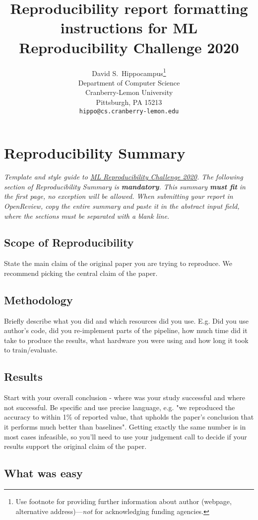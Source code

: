 \documentclass{article}
\title{Reproducibility report formatting instructions for ML Reproducibility Challenge 2020}
\author{%
  David S.~Hippocampus\thanks{Use footnote for providing further information
    about author (webpage, alternative address)---\emph{not} for acknowledging
    funding agencies.} \\
  Department of Computer Science\\
  Cranberry-Lemon University\\
  Pittsburgh, PA 15213 \\
  \texttt{hippo@cs.cranberry-lemon.edu} \\
}
\begin{document}
\maketitle

\section*{\centering Reproducibility Summary}

\textit{Template and style guide to \href{https://paperswithcode.com/rc2020}{ML Reproducibility Challenge 2020}. The following section of Reproducibility Summary is \textbf{mandatory}. This summary \textbf{must fit} in the first page, no exception will be allowed. When submitting your report in OpenReview, copy the entire summary and paste it in the abstract input field, where the sections must be separated with a blank line.
}

\subsection*{Scope of Reproducibility}

State the main claim of the original paper you are trying to reproduce. We recommend picking the central claim of the paper. 

\subsection*{Methodology}

Briefly describe what you did and which resources did you use. E.g. Did you use author's code, did you re-implement parts of the pipeline, how much time did it take to produce the results, what hardware you were using and how long it took to train/evaluate. 


\subsection*{Results}

Start with your overall conclusion - where was your study successful and where not successful. Be specific and use precise language, e.g. "we reproduced the accuracy to within 1\% of reported value, that upholds the paper's conclusion that it performs much better than baselines". Getting exactly the same number is in most cases infeasible, so you'll need to use your judgement call to decide if your results support the original claim of the paper. 

\subsection*{What was easy}
\end{document}
